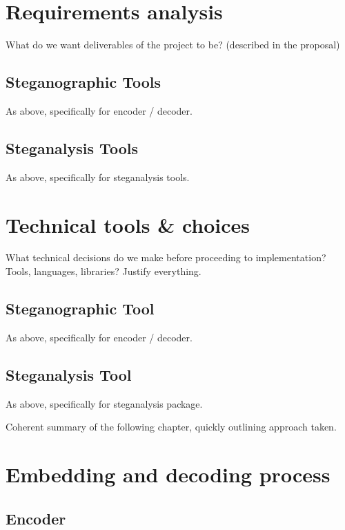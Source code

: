\documentclass[12pt,british,twoside,notitlepage,usenames,dvipsnames,hypens,final]{report}
\numberwithin{equation}{section}
\numberwithin{figure}{section}
\begin{document}
\section{Requirements analysis}

What do we want deliverables of the project to be? (described in the proposal)

\subsection{Steganographic Tools}

As above, specifically for encoder / decoder.

\subsection{Steganalysis Tools}

As above, specifically for steganalysis tools.

\section{Technical tools \& choices}

What technical decisions do we make before proceeding to implementation? Tools, languages, libraries? Justify everything.

\subsection{Steganographic Tool}

As above, specifically for encoder / decoder.

\subsection{Steganalysis Tool}

As above, specifically for steganalysis package.


Coherent summary of the following chapter, quickly outlining approach taken.

\section{Embedding and decoding process}

\subsection{Encoder}
\end{document}
